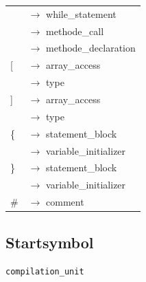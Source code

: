 \documentclass[10pt,a4paper,titlepage]{article}
\begin{document}
\begin{ttfamily}
\begin{tabular}{| l  l |}
 & $\to$ while\_statement\\
 & $\to$ methode\_call \\
 & $\to$ methode\_declaration \\\hline
\hspace*{1.5cm}[ & $\to$ array\_access \\
 & $\to$ type \\\hline
\hspace*{1.5cm}] & $\to$ array\_access \\
 & $\to$ type \\\hline
\hspace*{1.5cm}\{ & $\to$ statement\_block \\
 & $\to$ variable\_initializer\\\hline
\hspace*{1.5cm}\} & $\to$ statement\_block \\
 & $\to$ variable\_initializer\\\hline
\hspace*{1.5cm}\# & $\to$ comment\\\hline
\end{tabular}
\end{ttfamily}

\subsection{Startsymbol}
\texttt{compilation\_unit}
\end{document}
